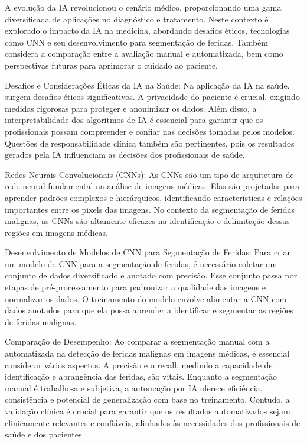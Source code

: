 A evolução da \ac{IA} revolucionou o cenário médico, proporcionando uma gama diversificada de aplicações no diagnóstico e tratamento. Neste contexto é explorado o impacto da IA na medicina, abordando desafios éticos, tecnologias como \ac{CNN} e seu desenvolvimento para segmentação de feridas. Também considera a comparação entre a avaliação manual e automatizada, bem como perspectivas futuras para aprimorar o cuidado ao paciente.

Desafios e Considerações Éticas da \ac{IA} na Saúde: Na aplicação da \ac{IA} na saúde, surgem desafios éticos significativos. A privacidade do paciente é crucial, exigindo medidas rigorosas para proteger e anonimizar os dados. Além disso, a interpretabilidade dos algoritmos de \ac{IA} é essencial para garantir que os profissionais possam compreender e confiar nas decisões tomadas pelos modelos. Questões de responsabilidade clínica também são pertinentes, pois os resultados gerados pela \ac{IA} influenciam as decisões dos profissionais de saúde.

Redes Neurais Convolucionais (CNNs): As \ac{CNNs} são um tipo de arquitetura de rede neural fundamental na análise de imagens médicas. Elas são projetadas para aprender padrões complexos e hierárquicos, identificando características e relações importantes entre os pixels das imagens. No contexto da segmentação de feridas malignas, as \ac{CNNs} são altamente eficazes na identificação e delimitação dessas regiões em imagens médicas.

Desenvolvimento de Modelos de \ac{CNN} para Segmentação de Feridas: Para criar um modelo de \ac{CNN} para a segmentação de feridas, é necessário coletar um conjunto de dados diversificado e anotado com precisão. Esse conjunto passa por etapas de pré-processamento para padronizar a qualidade das imagens e normalizar os dados. O treinamento do modelo envolve alimentar a \ac{CNN} com dados anotados para que ela possa aprender a identificar e segmentar as regiões de feridas malignas.

Comparação de Desempenho: Ao comparar a segmentação manual com a automatizada na detecção de feridas malignas em imagens médicas, é essencial considerar vários aspectos. A precisão e o recall, medindo a capacidade de identificação e abrangência das feridas, são vitais. Enquanto a segmentação manual é trabalhosa e subjetiva, a automação por IA oferece eficiência, consistência e potencial de generalização com base no treinamento. Contudo, a validação clínica é crucial para garantir que os resultados automatizados sejam clinicamente relevantes e confiáveis, alinhados às necessidades dos profissionais de saúde e dos pacientes.

